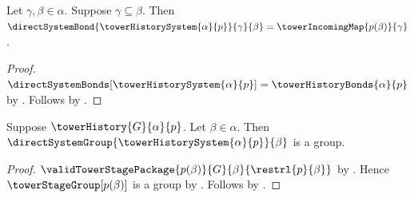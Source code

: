 \begin{proposition}\label{tower_history_system_bond}
    Let $\gamma,\beta\in\alpha$.
    Suppose $\gamma\subseteq\beta$.
    Then $\directSystemBond{\towerHistorySystem{\alpha}{p}}
        {\gamma}{\beta}=\towerIncomingMap{p(\beta)}{\gamma}$.
\end{proposition}
\begin{proof}
    $\directSystemBonds[\towerHistorySystem{\alpha}{p}]
        =\towerHistoryBonds{\alpha}{p}$ by
        .
    Follows by
        .
\end{proof}

\begin{proposition}\label{tower_history_system_stage_group}
    Suppose $\towerHistory{G}{\alpha}{p}$.
    Let $\beta\in\alpha$.
    Then $\directSystemGroup{\towerHistorySystem{\alpha}{p}}{\beta}$
        is a group.
\end{proposition}
\begin{proof}
    $\validTowerStagePackage
        {p(\beta)}{G}{\beta}{\restrl{p}{\beta}}$ by
        .
    Hence $\towerStageGroup[p(\beta)]$ is a group by
        .
    Follows by .
\end{proof}

